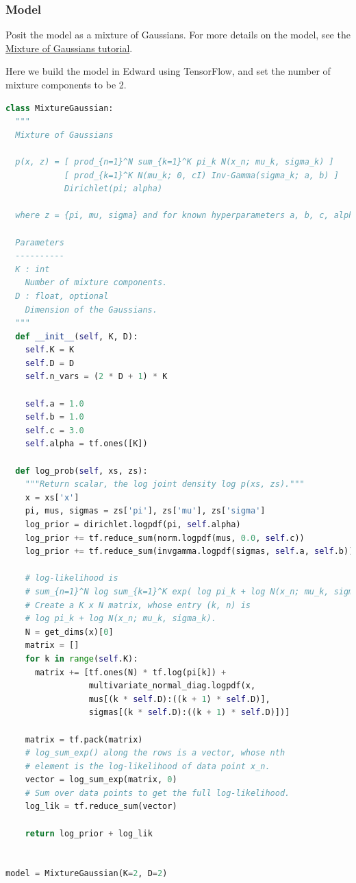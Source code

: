 \subsubsection{Model}

Posit the model as a mixture of Gaussians. For more details on the
model, see the
\href{tut_mixture_gaussian.html}
{Mixture of Gaussians tutorial}.

Here we build the model in Edward using TensorFlow, and set the number
of mixture components to be 2.
\begin{lstlisting}[language=Python]
class MixtureGaussian:
  """
  Mixture of Gaussians

  p(x, z) = [ prod_{n=1}^N sum_{k=1}^K pi_k N(x_n; mu_k, sigma_k) ]
            [ prod_{k=1}^K N(mu_k; 0, cI) Inv-Gamma(sigma_k; a, b) ]
            Dirichlet(pi; alpha)

  where z = {pi, mu, sigma} and for known hyperparameters a, b, c, alpha.

  Parameters
  ----------
  K : int
    Number of mixture components.
  D : float, optional
    Dimension of the Gaussians.
  """
  def __init__(self, K, D):
    self.K = K
    self.D = D
    self.n_vars = (2 * D + 1) * K

    self.a = 1.0
    self.b = 1.0
    self.c = 3.0
    self.alpha = tf.ones([K])

  def log_prob(self, xs, zs):
    """Return scalar, the log joint density log p(xs, zs)."""
    x = xs['x']
    pi, mus, sigmas = zs['pi'], zs['mu'], zs['sigma']
    log_prior = dirichlet.logpdf(pi, self.alpha)
    log_prior += tf.reduce_sum(norm.logpdf(mus, 0.0, self.c))
    log_prior += tf.reduce_sum(invgamma.logpdf(sigmas, self.a, self.b))

    # log-likelihood is
    # sum_{n=1}^N log sum_{k=1}^K exp( log pi_k + log N(x_n; mu_k, sigma_k) )
    # Create a K x N matrix, whose entry (k, n) is
    # log pi_k + log N(x_n; mu_k, sigma_k).
    N = get_dims(x)[0]
    matrix = []
    for k in range(self.K):
      matrix += [tf.ones(N) * tf.log(pi[k]) +
                 multivariate_normal_diag.logpdf(x,
                 mus[(k * self.D):((k + 1) * self.D)],
                 sigmas[(k * self.D):((k + 1) * self.D)])]

    matrix = tf.pack(matrix)
    # log_sum_exp() along the rows is a vector, whose nth
    # element is the log-likelihood of data point x_n.
    vector = log_sum_exp(matrix, 0)
    # Sum over data points to get the full log-likelihood.
    log_lik = tf.reduce_sum(vector)

    return log_prior + log_lik


model = MixtureGaussian(K=2, D=2)
\end{lstlisting}


